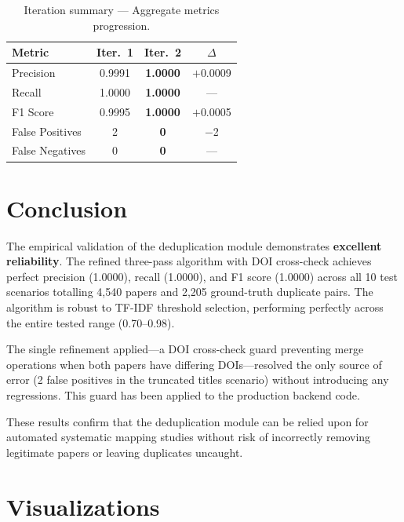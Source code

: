 \documentclass[conference]{IEEEtran}
\begin{document}
\begin{table}[htbp]
\centering
\caption{Iteration summary --- Aggregate metrics progression.}
\label{tab:iteration_summary}
\begin{tabular}{@{}lccc@{}}
\toprule
\textbf{Metric} & \textbf{Iter.\ 1} & \textbf{Iter.\ 2} & \textbf{$\Delta$} \\
\midrule
Precision       & 0.9991 & \textbf{1.0000} & $+$0.0009 \\
Recall          & 1.0000 & \textbf{1.0000} & --- \\
F1 Score        & 0.9995 & \textbf{1.0000} & $+$0.0005 \\
False Positives & 2      & \textbf{0}      & $-$2 \\
False Negatives & 0      & \textbf{0}      & --- \\
\bottomrule
\end{tabular}
\end{table}

\section{Conclusion}

The empirical validation of the deduplication module demonstrates \textbf{excellent reliability}. The refined three-pass algorithm with DOI cross-check achieves perfect precision (1.0000), recall (1.0000), and F1 score (1.0000) across all 10 test scenarios totalling 4{,}540 papers and 2{,}205 ground-truth duplicate pairs. The algorithm is robust to TF-IDF threshold selection, performing perfectly across the entire tested range (0.70--0.98).

The single refinement applied---a DOI cross-check guard preventing merge operations when both papers have differing DOIs---resolved the only source of error (2 false positives in the truncated titles scenario) without introducing any regressions. This guard has been applied to the production backend code.

These results confirm that the deduplication module can be relied upon for automated systematic mapping studies without risk of incorrectly removing legitimate papers or leaving duplicates uncaught.

\section*{Visualizations}
\end{document}

